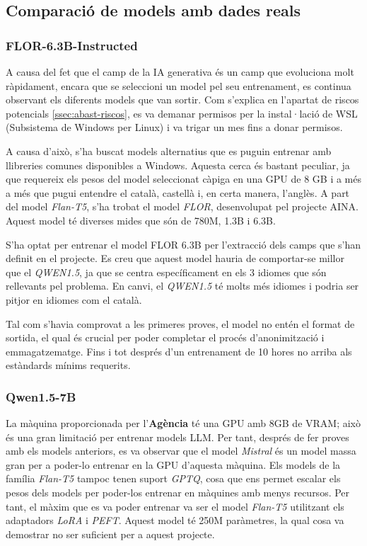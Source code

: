 \subsection{Comparació de models amb dades reals}

\subsubsection{FLOR-6.3B-Instructed}
A causa del fet que el camp de la IA generativa és un camp que evoluciona molt ràpidament, encara que se seleccioni un model pel seu entrenament, es continua observant els diferents models que van sortir. Com s'explica en l'apartat de riscos potencials \ref{ssec:abast-riscos}, es va demanar permisos per la instal·lació de WSL (Subsistema de Windows per Linux) i va trigar un mes fins a donar permisos.

A causa d'això, s'ha buscat models alternatius que es puguin entrenar amb llibreries comunes disponibles a Windows. Aquesta cerca és bastant peculiar, ja que requereix els pesos del model seleccionat càpiga en una GPU de 8 GB i a més a més que pugui entendre el català, castellà i, en certa manera, l'anglès. A part del model \textit{Flan-T5}, s'ha trobat el model \textit{FLOR}, desenvolupat pel projecte AINA. Aquest model té diverses mides que són de 780M, 1.3B i 6.3B.

S'ha optat per entrenar el model FLOR 6.3B per l'extracció dels camps que s'han definit en el projecte. Es creu que aquest model hauria de comportar-se millor que el \textit{QWEN1.5}, ja que se centra específicament en els 3 idiomes que són rellevants pel problema. En canvi, el \textit{QWEN1.5} té molts més idiomes i podria ser pitjor en idiomes com el català.

Tal com s'havia comprovat a les primeres proves, el model no entén el format de sortida, el qual és crucial per poder completar el procés d'anonimització i emmagatzematge. Fins i tot després d'un entrenament de 10 hores no arriba als estàndards mínims requerits.

\subsubsection{Qwen1.5-7B}
La màquina proporcionada per l'\textbf{Agència} té una GPU amb 8GB de VRAM; això és una gran limitació per entrenar models LLM. Per tant, després de fer proves amb els models anteriors, es va observar que el model \textit{Mistral} és un model massa gran per a poder-lo entrenar en la GPU d'aquesta màquina. Els models de la família \textit{Flan-T5} tampoc tenen suport \textit{GPTQ}, cosa que ens permet escalar els pesos dels models per poder-los entrenar en màquines amb menys recursos. Per tant, el màxim que es va poder entrenar va ser el model \textit{Flan-T5} utilitzant els adaptadors \textit{LoRA} i \textit{PEFT}. Aquest model té 250M paràmetres, la qual cosa va demostrar no ser suficient per a aquest projecte.

